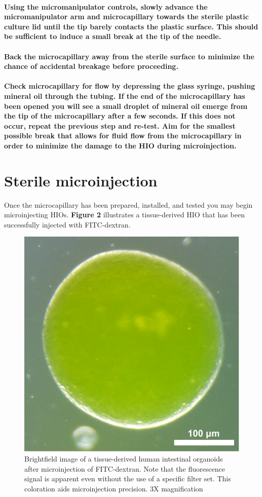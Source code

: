 \documentclass[11pt]{article}
\begin{document}
\paragraph{{\sffamily } Using the micromanipulator controls, slowly advance the micromanipulator arm and microcapillary towards the sterile plastic culture lid until the tip barely contacts the plastic surface. This should be sufficient to induce a small break at the tip of the needle.}
\label{sec:orgheadline37}
\paragraph{{\sffamily } Back the microcapillary away from the sterile surface to minimize the chance of accidental breakage before proceeding.}
\label{sec:orgheadline38}
\paragraph{{\sffamily } Check microcapillary for flow by depressing the glass syringe, pushing mineral oil through the tubing. If the end of the microcapillary has been opened you will see a small droplet of mineral oil emerge from the tip of the microcapillary after a few seconds. If this does not occur, repeat the previous step and re-test. Aim for the smallest possible break that allows for fluid flow from the microcapillary in order to minimize the damage to the HIO during microinjection.}
\label{sec:orgheadline39}



\section{{\sffamily } Sterile microinjection}
\label{sec:orgheadline57}
Once the microcapillary has been prepared, installed, and tested you may begin microinjecting HIOs. \textbf{Figure 2} illustrates a tissue-derived HIO that has been successfully injected with FITC-dextran.\\
\begin{figure}
\centering
\includegraphics[width=0.35\linewidth]{./img/figure3.pdf}
\caption{Brightfield image of a tissue-derived human intestinal organoids after microinjection of FITC-dextran. Note that the fluorescence signal is apparent even without the use of a specific filter set. This coloration aids microinjection precision. 3X magnification}
\end{figure}
\end{document}
